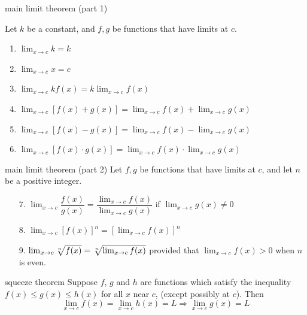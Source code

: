 \documentclass[avery5371,grid]{flashcards}
\begin{document}
\begin{flashcard}[Theorem]{main limit theorem (part 1)}
\begin{small}
Let $k$ be a constant, and $f, g$ be
functions that have limits at $c$.
\begin{enumerate}
\item $\lim_{x\rightarrow c}k = k$
\item $\lim_{x\rightarrow c}x = c$
\item $\lim_{x\rightarrow c}kf(x) = k\lim_{x\rightarrow c}f(x)$
\item $\lim_{x\rightarrow c}[f(x)+g(x)] =
\lim_{x\rightarrow c}f(x) + \lim_{x\rightarrow c}g(x)$
\item $\lim_{x\rightarrow c}[f(x)-g(x)] =
\lim_{x\rightarrow c}f(x) - \lim_{x\rightarrow c}g(x)$
\item $\lim_{x\rightarrow c}[f(x)\cdot g(x)] =
\lim_{x\rightarrow c}f(x) \cdot \lim_{x\rightarrow c}g(x)$
\end{enumerate}
\end{small}
\end{flashcard}

\begin{flashcard}[Theorem]{main limit theorem (part 2)}
Let $f, g$ be functions that have limits at $c$, and let $n$
be a positive integer.
\begin{enumerate}
\item[7.] $\lim_{x\rightarrow c}\dfrac{f(x)}{g(x)} =
\dfrac{\lim_{x\rightarrow c}f(x)}{\lim_{x\rightarrow c}g(x)}$
if $\lim_{x\rightarrow c}g(x) \neq 0$
\item[8.] $\lim_{x\rightarrow c}[f(x)]^{n} =
[\lim_{x\rightarrow c}f(x)]^{n}$
\item[9.] $\lim_{x\rightarrow c} \root n\of{f(x)} =
\root n\of{\lim_{x\rightarrow c}f(x)}$ provided that 
$\lim_{x\rightarrow c}f(x) > 0 $ when $n$ is even.
\end{enumerate}
\end{flashcard}

\begin{flashcard}[Theorem]{squeeze theorem}
Suppose $f$, $g$ and $h$ are functions which satisfy
the inequality $f(x) \leq g(x) \leq h(x)$ for all $x$
near $c$, (except possibly at $c$).  Then
\begin{equation*}
\lim_{x \rightarrow c} f(x) = \lim_{x \rightarrow c} h(x) = L
\Rightarrow \lim_{x \rightarrow c} g(x) = L
\end{equation*}
\end{flashcard}
\end{document}
